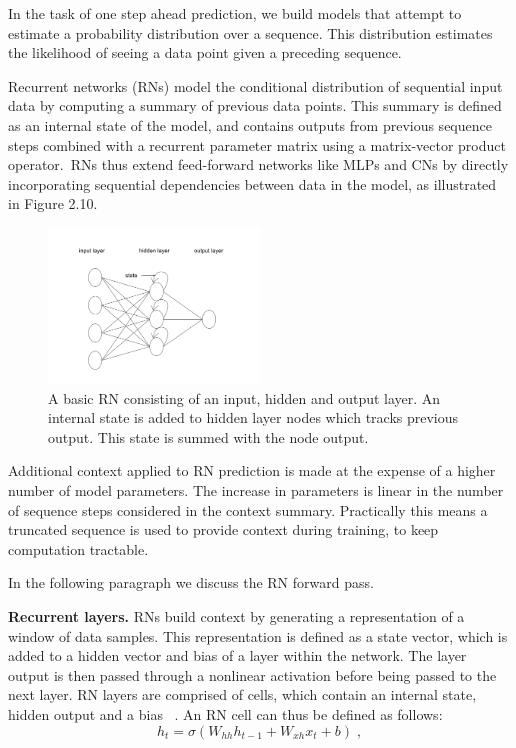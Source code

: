 \noindent In the task of one step ahead prediction, we build models that attempt to estimate a probability distribution over a sequence. This distribution estimates the likelihood of seeing a data point given a preceding sequence. \par 

\noindent Recurrent networks (RNs) model the conditional distribution of sequential input data by computing a summary of previous data points. This summary is defined as an internal state of the model, and contains outputs from previous sequence steps combined with a recurrent parameter matrix using a matrix-vector product operator.\ RNs thus extend feed-forward networks like MLPs and CNs by directly incorporating sequential dependencies between data in the model, as illustrated in Figure 2.10. \par

\begin{figure}[H]
   	\centering
    	\includegraphics[width=0.5\textwidth, height=0.3\textwidth]{recurrent_network}
	\captionsetup{justification=centering}
	\caption{A basic RN consisting of an input, hidden and output layer. An internal state is added to hidden layer nodes which tracks previous output. This state is summed with the node output.}
\end{figure}

\noindent Additional context applied to RN prediction is made at the expense of a higher number of model parameters. The increase in parameters is linear in the number of sequence steps considered in the context summary. Practically this means a truncated sequence is used to provide context during training, to keep computation tractable. \par

\noindent In the following paragraph we discuss the RN forward pass. \par

\noindent \textbf{Recurrent layers.} RNs build context by generating a representation of a window of data samples. This representation is defined as a state vector, which is added to a hidden vector and bias of a layer within the network. The layer output is then passed through a nonlinear activation before being passed to the next layer. RN layers are comprised of cells, which contain an internal state, hidden output and a bias \unskip ~\citep{DLIndaba2018}. An RN cell can thus be defined as follows: 
\begin{equation}
	h_t = \sigma(W_{hh}h_{t-1} + W_{xh}x_t + b) \; ,
\end{equation}

